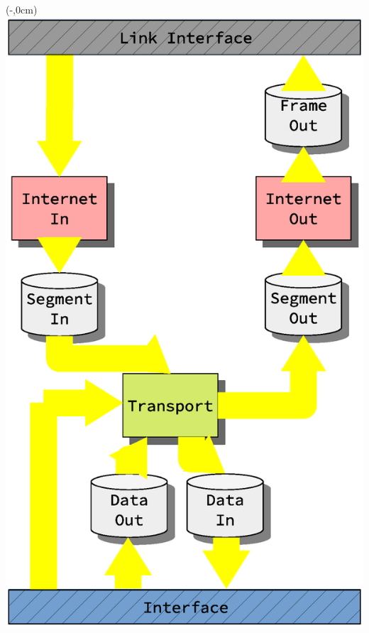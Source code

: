 \begin{frame}[fragile]
\begin{figure}
\begin{overlayarea}{0.76\textwidth}{\textheight}
        \end{overlayarea}
    \end{figure}
\end{frame}


\begin{frame}[fragile]
    \begin{textblock*}{\displayThumbnail}(\paperwidth-\displayThumbnail-0.2cm,0cm) %
        \colorbox{white}{\includegraphics[width=\textwidth]{implementation/design_2_busses.eps}}
    \end{textblock*}
    \frametitle{\ImplementationTitle}

\end{frame}
